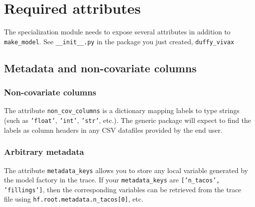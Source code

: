 \section{Required attributes}

The specialization module needs to expose several attributes in addition to \texttt{make\_model}. See \texttt{\_\_init\_\_.py} in the package you just created, \texttt{duffy\_vivax}

\subsection{Metadata and non-covariate columns}
\subsubsection{Non-covariate columns} 
The attribute \texttt{non\_cov\_columns} is a dictionary mapping labels to type strings (such as \texttt{'float'}, \texttt{'int'}, \texttt{'str'}, etc.). The generic package will expect to find the labels as column headers in any CSV datafiles provided by the end user. 
\subsubsection{Arbitrary metadata} 
The attribute \texttt{metadata\_keys} allows you to store any local variable generated by the model factory in the trace. If your \texttt{metadata\_keys} are \texttt{['n\_tacos', 'fillings']}, then the corresponding variables can be retrieved from the trace file using \texttt{hf.root.metadata.n\_tacos[0]}, etc.

